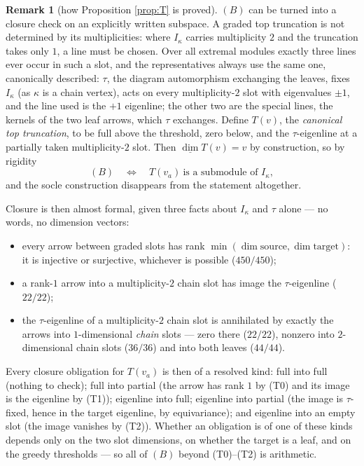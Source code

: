 \documentclass[11pt,reqno]{amsart}
\theoremstyle{plain}
\theoremstyle{definition}
\newtheorem{remark}[theorem]{Remark}
\newcommand{\dimv}{\underline{\dim}}
\newcommand{\ka}{\kappa}
\begin{document}
\begin{remark}[how Proposition \ref{prop:T} is proved]
$(B)$ can be turned into a closure check on an explicitly written subspace.  A
graded top truncation is not determined by its multiplicities: where $I_\ka$
carries multiplicity $2$ and the truncation takes only $1$, a line must be
chosen.  Over all extremal modules exactly three lines ever occur in such a
slot, and the representatives always use the same one, canonically described:
$\tau$, the diagram automorphism exchanging the leaves, fixes $I_\ka$ (as $\ka$
is a chain vertex), acts on every multiplicity-$2$ slot with eigenvalues
$\pm1$, and the line used is the $+1$ eigenline; the other two are the special
lines, the kernels of the two leaf arrows, which $\tau$ exchanges.  Define
$T(v)$, the \emph{canonical top truncation}, to be full above the threshold,
zero below, and the $\tau$-eigenline at a partially taken multiplicity-$2$
slot.  Then $\dimv T(v)=v$ by construction, so by rigidity
\[
   (B)\quad\Longleftrightarrow\quad T(v_a)\ \text{is a submodule of } I_\ka ,
\]
and the socle construction disappears from the statement altogether.

Closure is then almost formal, given three facts about $I_\ka$ and $\tau$
alone --- no words, no dimension vectors:
\begin{itemize}\itemsep0pt
\item[(T0)] every arrow between graded slots has rank
$\min(\dim\text{source},\dim\text{target})$: it is injective or surjective,
whichever is possible ($450/450$);
\item[(T1)] a rank-$1$ arrow into a multiplicity-$2$ chain slot has image the
$\tau$-eigenline ($22/22$);
\item[(T2)] the $\tau$-eigenline of a multiplicity-$2$ chain slot is
annihilated by exactly the arrows into $1$-dimensional \emph{chain} slots ---
zero there ($22/22$), nonzero into $2$-dimensional chain slots ($36/36$) and
into both leaves ($44/44$).
\end{itemize}
Every closure obligation for $T(v_a)$ is then of a resolved kind: full into
full (nothing to check); full into partial (the arrow has rank $1$ by (T0) and
its image is the eigenline by (T1)); eigenline into full; eigenline into
partial (the image is $\tau$-fixed, hence in the target eigenline, by
equivariance); and eigenline into an empty slot (the image vanishes by (T2)).
Whether an obligation is of one of these kinds depends only on the two slot
dimensions, on whether the target is a leaf, and on the greedy thresholds --- so
all of $(B)$ beyond (T0)--(T2) is arithmetic.


\end{remark}
\end{document}
